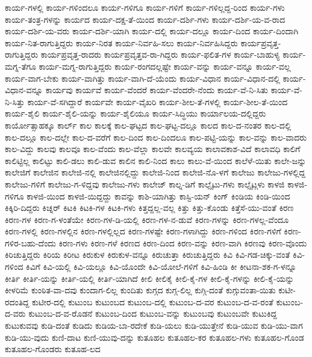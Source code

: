 {ಕಾರ್ಯ-ಗಳಲ್ಲಿ
ಕಾರ್ಯ-ಗಳಿಂದಲೂ
ಕಾರ್ಯ-ಗಳಿಗೂ
ಕಾರ್ಯ-ಗಳಿಗೆ
ಕಾರ್ಯ-ಗಳಿಲ್ಲದ್ದ-ರಿಂದ
ಕಾರ್ಯ-ಗಳು
ಕಾರ್ಯ-ತಂತ್ರ-ಗಳನ್ನು
ಕಾರ್ಯದ
ಕಾರ್ಯ-ದಕ್ಷ-ತೆ-ಯಿಂದ
ಕಾರ್ಯ-ದರ್ಶಿ-ಗಳು
ಕಾರ್ಯ-ದರ್ಶಿ-ಯ-ವ-ರಾದ
ಕಾರ್ಯ-ದರ್ಶಿ-ಯ-ವರು
ಕಾರ್ಯ-ದರ್ಶಿ-ಯಾಗಿ
ಕಾರ್ಯ-ದಲ್ಲಿ
ಕಾರ್ಯ-ದಲ್ಲೂ
ಕಾರ್ಯ-ದಿಂದ
ಕಾರ್ಯ-ದಿಂದಾಗಿ
ಕಾರ್ಯ-ನಿತ-ರಾಗುತ್ತಿದ್ದರು
ಕಾರ್ಯ-ನಿರತ
ಕಾರ್ಯ-ನಿರ್ವಹಿ-ಸಲು
ಕಾರ್ಯ-ನಿರ್ವಹಿಸಿದ್ದರು
ಕಾರ್ಯಪ್ರವೃತ್ತ-ರಾಗುತ್ತಿದ್ದರು
ಕಾರ್ಯಪ್ರವೃತ್ತ-ರಾದರು
ಕಾರ್ಯಪ್ರವೃತ್ತವ-ರಾ-ಗಿದ್ದರು
ಕಾರ್ಯ-ಫಲಿತ-ಗಳ
ಕಾರ್ಯ-ಬಾಹುಳ್ಯ
ಕಾರ್ಯ-ಮಗ್ನ-ತೆಗೂ
ಕಾರ್ಯ-ಮಗ್ನ-ರಾಗುತ್ತಿದ್ದರು
ಕಾರ್ಯ-ರಂಗದಲ್ಲಷ್ಟೇ
ಕಾರ್ಯ-ವನ್ನು
ಕಾರ್ಯ-ವನ್ನೂ
ಕಾರ್ಯ-ವಲ್ಲ
ಕಾರ್ಯ-ವಾಗ-ಬೇಕು
ಕಾರ್ಯ-ವಾಗಿತ್ತು
ಕಾರ್ಯ-ವಾಗಿ-ದೆ-ಯೆಂದು
ಕಾರ್ಯ-ವಿಧಾನ
ಕಾರ್ಯ-ವಿಧಾನ-ದಲ್ಲಿ
ಕಾರ್ಯ-ವಿಧಾನ-ವನ್ನೂ
ಕಾರ್ಯವು
ಕಾರ್ಯವೆ
ಕಾರ್ಯ-ವೆಂದರೆ
ಕಾರ್ಯ-ವೆಂದರೇ-ನೆಂದು
ಕಾರ್ಯ-ವೆ-ನಿ-ಸಿತು
ಕಾರ್ಯ-ವೆ-ನಿ-ಸಿತ್ತು
ಕಾರ್ಯ-ವೆ-ಸಗಿದ್ದಾರೆ
ಕಾರ್ಯವೇ
ಕಾರ್ಯ-ವೈಖರಿ
ಕಾರ್ಯ-ಶೀಲ-ತೆ-ಗಳಲ್ಲಿ
ಕಾರ್ಯ-ಶೀಲ-ತೆ-ಯಿಂದ
ಕಾರ್ಯ-ಶೈಲಿ
ಕಾರ್ಯ-ಶೈಲಿ-ಯನ್ನು
ಕಾರ್ಯ-ಶೈಲಿಯೂ
ಕಾರ್ಯ-ಸಿದ್ಧಿಯು
ಕಾರ್ಯಾಲಯ-ದಲ್ಲಿದ್ದರು
ಕಾರ್ಯೋತ್ಸಾಹಕ್ಕೂ
ಕಾರ್ಲ್
ಕಾಲ
ಕಾಲಕ್ಕೆ
ಕಾಲ-ಘಟ್ಟದ
ಕಾಲ-ಘಟ್ಟ-ದಲ್ಲೂ
ಕಾಲದ
ಕಾಲ-ದ-ನಂತರ
ಕಾಲ-ದಲ್ಲಿ
ಕಾಲ-ದಲ್ಲೂ
ಕಾಲ-ದಲ್ಲೇ
ಕಾಲ-ದ-ವರೆಗೆ
ಕಾಲ-ದಿಂದ
ಕಾಲ-ದಿಂದಲೂ
ಕಾಲ-ಪಟ್ಟಿ-ಯನ್ನು
ಕಾಲ-ವನ್ನು
ಕಾಲ-ವಾದರು
ಕಾಲ-ವಿದ್ದು
ಕಾಲವು
ಕಾಲವೂ
ಕಾಲ-ವೆಂದು
ಕಾಲ-ವೆಲ್ಲಾ
ಕಾಲವೇ
ಕಾಲವ್ಯಯ
ಕಾಲಾವಕಾಶ-ವಿದೆ
ಕಾಲಾವಧಿ
ಕಾಲಿಗೆ
ಕಾಲಿಟ್ಟಿಲ್ಲ
ಕಾಲಿಟ್ಟು
ಕಾಲಿ-ಡಲು
ಕಾಲಿ-ಡುವ
ಕಾಲಿನ
ಕಾಲಿ-ನಿಂದ
ಕಾಲು
ಕಾಲು-ವೆ-ಯಿಂದ
ಕಾಲೆಳೆ-ಯಿತು
ಕಾಲೇ-ಜನ್ನು
ಕಾಲೇಜಿಗೆ
ಕಾಲೇಜಿನ
ಕಾಲೇಜಿ-ನಲ್ಲಿ
ಕಾಲೇಜಿನಲ್ಲಿದ್ದು
ಕಾಲೇಜಿ-ನಿಂದ
ಕಾಲೇಜಿ-ನೊ-ಳಗೆ
ಕಾಲೇಜು
ಕಾಲೇಜು-ಗಳಲ್ಲಿದ್ದ
ಕಾಲೇಜು-ಗಳಿಗೆ
ಕಾಲೇಜು-ಗ-ಳಿದ್ದವು
ಕಾಲೇಜು-ಗಳು
ಕಾಲೇಜ್
ಕಾಲ್ನ-ಡಿಗೆ
ಕಾಲ್ಸೈಟು-ಗಳು
ಕಾಲ್ಸೈಟ್ಗಳು
ಕಾಳಜಿ
ಕಾಳಜಿ-ಗಳಿಗೂ
ಕಾಳಜಿ-ಯಿಂದ
ಕಾಳಜಿ-ಯಿದ್ದದ್ದು
ಕಾವನ್ನು
ಕಾಶಿ-ಯಾಗಿತ್ತು
ಕಾಸ್ಟಿ-ಯನ್
ಕಿಂಗ್
ಕಿಂಡಿಯ
ಕಿಂಡಿ-ಯಿಂದ
ಕಿಕ್ಕಿರಿ-ದಿದ್ದರು
ಕಿಚ್ನರ್
ಕಿಟಕಿ
ಕಿಟಕಿ-ಗಳ
ಕಿಟಕಿ-ಗಳು
ಕಿತ್ತದ್ದಲ್ಲ-ವಲ್ಲ
ಕಿತ್ತು
ಕಿತ್ತು-ಕೊಂಡು
ಕಿತ್ತೆಸೆ-ಯು-ವಂತೆ
ಕಿರಣ
ಕಿರಣ-ಗಳ
ಕಿರಣ-ಗ-ಳಂತೆಯೇ
ಕಿರಣ-ಗಳ-ಡಿ-ಯಲ್ಲಿ
ಕಿರಣ-ಗಳ-ನ-ಡುವೆ
ಕಿರಣ-ಗಳನ್ನು
ಕಿರಣ-ಗಳಲ್ಲ-ವೆಂದೂ
ಕಿರಣ-ಗಳಲ್ಲಿ
ಕಿರಣ-ಗಳಲ್ಲಿನ
ಕಿರಣ-ಗಳಲ್ಲಿಲ್ಲದ
ಕಿರಣ-ಗಳಷ್ಟೇ
ಕಿರಣ-ಗಳಾಗಿದ್ದು
ಕಿರಣ-ಗಳಿಂದ
ಕಿರಣ-ಗಳಿಗೆ
ಕಿರಣ-ಗಳಿರ-ಬಹು-ದೆಂದು
ಕಿರಣ-ಗಳು
ಕಿರಣ-ಗಳೆ
ಕಿರಣದ
ಕಿರಣ-ದಿಂದ
ಕಿರಣ-ವನ್ನು
ಕಿರಣ-ವಾಗಿ
ಕಿರಣವು
ಕಿರಣ-ವೊಂದು
ಕಿರಿಚುತ್ತಿದ್ದರು
ಕಿರಿಯ
ಕಿರೀಟ
ಕಿರುಕುಳ
ಕಿರುಕುಳ-ವನ್ನೂ
ಕಿರುಚುತ್ತಾ
ಕಿರುಚುತ್ತಿದ್ದರು
ಕಿವಿ
ಕಿವಿ-ಗಡ-ಚಿಕ್ಕು-ವಂತೆ
ಕಿವಿ-ಗಳಿಂದ
ಕಿವಿಗೆ
ಕಿವಿ-ಯಲ್ಲಿ
ಕಿವಿ-ಯಲ್ಲೂ
ಕಿವಿ-ಯೊಂದೇ
ಕಿವಿ-ಯೋಲೆ-ಗಳಿಗೆ
ಕಿವಿ-ಹಿಂಡಿ
ಕೀ
ಕೀಟನಾ-ಶಕ-ಗ-ಳನ್ನೂ
ಕೀರ್ತಿ
ಕೀರ್ತಿ-ಯನ್ನು
ಕೀರ್ತಿ-ಯಲ್ಲಿ
ಕೀರ್ತಿ-ಯಾಗಿದೆ
ಕೀಲಿ
ಕೀಲಿಕೈ
ಕೀಲಿ-ಕೈ-ಗಳ
ಕೀಲಿ-ಕೈ-ಗಳನ್ನು
ಕೀಲಿ-ಕೈ-ಯನ್ನು
ಕೀಳರಿಮೆ
ಕುಂಠಿತ-ವಾ-ದವು
ಕುಂದಾಗ-ಲಿಲ್ಲ
ಕುಂದಿತು
ಕುಗ್ಗದ
ಕುಗ್ಗ-ಲಿಲ್ಲ
ಕುಗ್ಗಿ-ದಂತೆ
ಕುಗ್ಗುವಂತಾ-ಯಿತು
ಕುಟೀ-ರದಂತಿದ್ದ
ಕುಟೀರ-ದಲ್ಲಿ
ಕುಟುಂಬ
ಕುಟುಂಬದ
ಕುಟುಂಬ-ದಲ್ಲಿ
ಕುಟುಂಬ-ದ-ವರ
ಕುಟುಂಬ-ದ-ವ-ರಂತೆ
ಕುಟುಂಬ-ದ-ವರು
ಕುಟುಂಬ-ದ-ವ-ರೊಡನೆ
ಕುಟುಂಬ-ದಿಂದ
ಕುಟುಂಬ-ವನ್ನು
ಕುಟುಂಬವು
ಕುಟುಂಬವೇ
ಕುಟುಕಿದ್ದ
ಕುಟುಕುವವು
ಕುಡಿ-ದಂತೆ
ಕುಡಿದು
ಕುಡಿಯ-ಬಾ-ರದೇಕೆ
ಕುಡಿ-ಯಲು
ಕುಡಿ-ಯುತ್ತೇನೆ
ಕುಡಿ-ಯುವ
ಕುಡಿ-ಯು-ವಾಗ
ಕುಡಿ-ಯು-ವುದು
ಕುಣಿ-ದಾಟ
ಕುಣಿ-ಯುವು-ದನ್ನು
ಕುತೂಹಲ
ಕುತೂಹಲ-ಕರ
ಕುತೂಹಲ-ಗಳು
ಕುತೂಹಲ-ಗೊಂಡ
ಕುತೂಹಲ-ಗೊಂಡರು
ಕುತೂಹ-ಲದ
}
